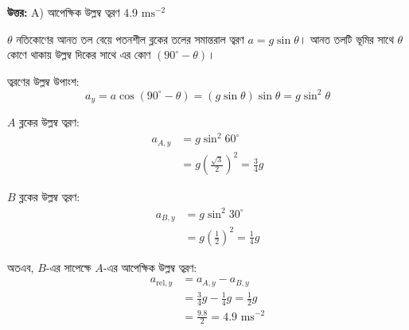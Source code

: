 \documentclass[12pt, a4paper]{article}
\begin{document}
\vspace{0.5em}
\begin{tcolorbox}[answerbox]
    \textbf{\color{success} উত্তর:} A) আপেক্ষিক উল্লম্ব ত্বরণ $4.9\text{ ms}^{-2}$
\end{tcolorbox}
\vspace{1em}

\begin{tcolorbox}[solutionbox={সমাধান (Solution)}]
    \noindent
    $\theta$ নতিকোণের আনত তল বেয়ে পতনশীল ব্লকের তলের সমান্তরাল ত্বরণ $a = g \sin\theta$।
    আনত তলটি ভূমির সাথে $\theta$ কোণে থাকায় উল্লম্ব দিকের সাথে এর কোণ $(90^\circ - \theta)$।
    
    ত্বরণের উল্লম্ব উপাংশ:
    \[ a_y = a \cos(90^\circ - \theta) = (g \sin\theta) \sin\theta = g \sin^2\theta \]
    
    $A$ ব্লকের উল্লম্ব ত্বরণ:
    \begin{align*}
        a_{A,y} &= g \sin^2 60^\circ \\
                &= g \left(\frac{\sqrt{3}}{2}\right)^2 = \frac{3}{4}g
    \end{align*}
    
    $B$ ব্লকের উল্লম্ব ত্বরণ:
    \begin{align*}
        a_{B,y} &= g \sin^2 30^\circ \\
                &= g \left(\frac{1}{2}\right)^2 = \frac{1}{4}g
    \end{align*}
    
    অতএব, $B$-এর সাপেক্ষে $A$-এর আপেক্ষিক উল্লম্ব ত্বরণ:
    \begin{align*}
        a_{\text{rel}, y} &= a_{A,y} - a_{B,y} \\
                          &= \frac{3}{4}g - \frac{1}{4}g = \frac{1}{2}g \\
                          &= \frac{9.8}{2} = \mathbf{4.9}\text{ ms}^{-2}
    \end{align*}
\end{tcolorbox}

\newpage
\end{document}
